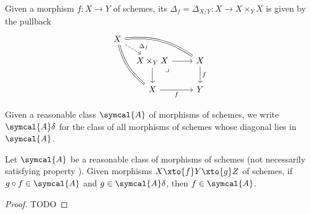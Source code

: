 \documentclass[wip, algebra]{bsteffan-lecturenotes}
\begin{document}
\begin{definition}\label{def:sch:diagonal}
	Given a morphism $f\colon X \to Y$ of schemes, its  $\Delta_f = \Delta_{X / Y}\colon X \to X \times_Y X$ is given by the pullback
	\begin{equation*}
		\begin{tikzcd}
			X
					\ar[dr, dashed, "\Delta_f" near end]
					\ar[drr, equals, bend left = 20]
					\ar[ddr, equals, bend right = 18]
			\\[-.7em]
				&[-1.5em] X \times_Y X
					\ar[r]
					\ar[d]
					\ar[dr, phantom, "\lrcorner" very near start]
				& X
					\ar[d, "f"]
			\\
				& X
					\ar[r, swap, "f"]
				& Y
		\end{tikzcd}
	\end{equation*}
\end{definition}
Given a reasonable class $\symcal{A}$ of morphisms of schemes, we write $\symcal{A}\delta$ for the class of all morphisms of schemes whose diagonal lies in $\symcal{A}$.
\begin{theorem}
	Let $\symcal{A}$ be a reasonable class of morphisms of schemes (not necessarily satisfying property ).
	Given morphisms $X \xto{f} Y \xto{g} Z$ of schemes, if $g \circ f \in \symcal{A}$ and $g \in \symcal{A}\delta$, then $f \in \symcal{A}$.
\end{theorem}
\begin{proof}
	TODO	
\end{proof}
\end{document}

